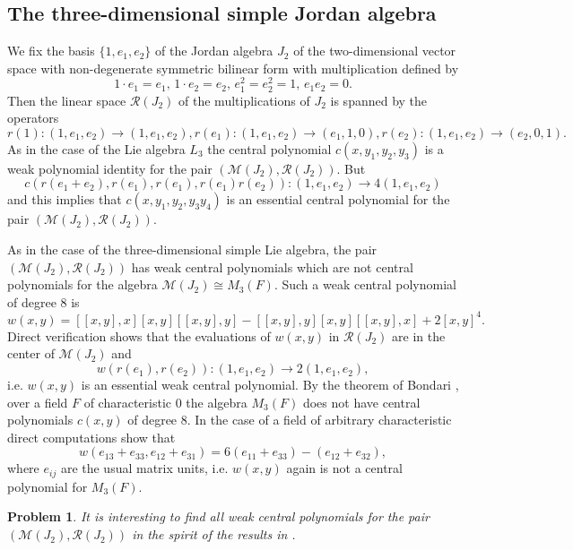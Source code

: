 \documentclass[10]{amsart}
\newtheorem{problem}[theorem]{Problem}
\theoremstyle{definition}
\begin{document}
\subsection{The three-dimensional simple Jordan algebra}
We fix the basis $\{1,e_1,e_2\}$ of the Jordan algebra $J_2$ of the two-dimensional vector space with non-degenerate symmetric bilinear form
with multiplication defined by
\[
1\cdot e_1=e_1,\,1\cdot e_2=e_2,\,e_1^2=e_2^2=1,\,e_1e_2=0.
\]
Then the linear space ${\mathcal R}(J_2)$ of the multiplications of $J_2$ is spanned by the operators
\[
r(1):(1,e_1,e_2)\to(1,e_1,e_2),r(e_1):(1,e_1,e_2)\to(e_1,1,0),r(e_2):(1,e_1,e_2)\to(e_2,0,1).
\]
As in the case of the Lie algebra $L_3$ the central polynomial $c(x,y_1,y_2,y_3)$ is a weak polynomial identity for the pair $({\mathcal M}(J_2),{\mathcal R}(J_2))$.
But
\[
c(r(e_1+e_2),r(e_1),r(e_1),r(e_1)r(e_2)):(1,e_1,e_2)\to 4(1,e_1,e_2)
\]
and this implies that $c(x,y_1,y_2,y_3y_4)$ is an essential central polynomial for the pair $({\mathcal M}(J_2),{\mathcal R}(J_2))$.

As in the case of the three-dimensional simple Lie algebra, the pair $({\mathcal M}(J_2),{\mathcal R}(J_2))$ has weak central polynomials
which are not central polynomials for the algebra ${\mathcal M}(J_2)\cong M_3(F)$. Such a weak central polynomial of degree 8 is
\[
w(x,y)=[[x,y],x][x,y][[x,y],y]-[[x,y],y][x,y][[x,y],x]+2[x,y]^4.
\]
Direct verification shows that the evaluations of $w(x,y)$ in ${\mathcal R}(J_2)$ are in the center of ${\mathcal M}(J_2)$
and
\[
w(r(e_1),r(e_2)):(1,e_1,e_2)\to 2(1,e_1,e_2),
\]
i.e. $w(x,y)$ is an essential weak central polynomial. By the theorem of Bondari \cite{Bo}, over a field $F$ of characteristic 0 the algebra $M_3(F)$ does not have central polynomials
$c(x,y)$ of degree 8. In the case of a field of arbitrary characteristic direct computations show that
\[
w(e_{13}+e_{33},e_{12}+e_{31})=6(e_{11}+e_{33})-(e_{12}+e_{32}),
\]
where $e_{ij}$ are the usual matrix units, i.e. $w(x,y)$ again is not a central polynomial for $M_3(F)$.

\begin{problem}
It is interesting to find all weak central polynomials for the pair $({\mathcal M}(J_2),{\mathcal R}(J_2))$
in the spirit of the results in \cite{DoD}.
\end{problem}
\end{document}
